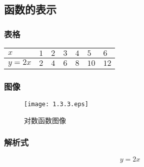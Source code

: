 \documentclass[12pt, a4paper, oneside, UTF8]{ctexbook}  %
\begin{document}
\subsection{函数的表示}
\subsubsection{表格}
\begin{table}[H]
    \begin{center}
        \begin{tabular}{|l|l|l|l|l|l|l|}
            \hline
            $x$    & $ 1$ & $2$ & $3$ & $4$ & $5$  & $6$  \\ \hline
            $y=2x$ & $2$  & $4$ & $6$ & $8$ & $10$ & $12$ \\ \hline
        \end{tabular}
    \end{center}
\end{table}
\subsubsection{图像}
\begin{figure}[H]
    \centering \texttt{[image: 1.3.3.eps]} \caption{对数函数图像}
\end{figure}
\subsubsection{解析式}
$$
    \boxed{y=2x}
$$
\end{document}
